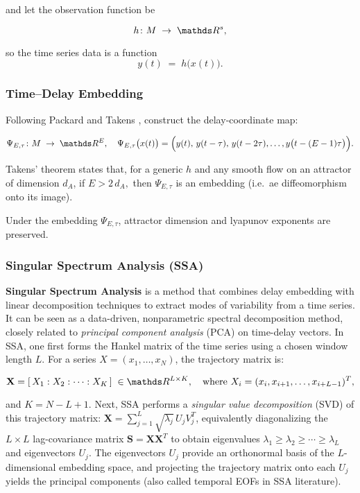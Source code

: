 \documentclass[14pt]{extarticle}
\begin{document}
	and let the observation function be
	
	$$
	h\colon M\;\to\;\dR^s, 
	$$
	
	so the time series data is a function $$ y(t)\;=\;h\bigl(x(t)\bigr). $$
	
	\subsubsection*{Time–Delay Embedding}
	
	Following Packard \citep{Packard1980} and Takens \citep{Takens1981}, construct the delay‐coordinate map:
	
	$$
	\Psi_{E,\tau}\colon M\;\to\;\dR^E,
	\quad
	\Psi_{E,\tau}\bigl(x(t)\bigr)
	=\Bigl(y(t),\,y(t-\tau),\,y(t-2\tau),\dots,y\bigl(t-(E-1)\tau\bigr)\Bigr).
	$$
	
	Takens’ theorem states that, for a generic $h$ and any smooth flow on an attractor of dimension $d_A$, if $E > 2\,d_A,$ then $\Psi_{E,\tau}$ is an embedding (i.e.\ ae diffeomorphism onto its image).
	
	Under the embedding $\Psi_{E,\tau}$, attractor dimension and lyapunov exponents are preserved.
	
	\subsubsection*{Singular Spectrum Analysis (SSA)}
	
	\textbf{Singular Spectrum Analysis} is a method that combines delay embedding with linear decomposition techniques to extract modes of variability from a time series. It can be seen as a data-driven, nonparametric spectral decomposition method, closely related to \textit{principal component analysis} (PCA) on time-delay vectors. In SSA, one first forms the Hankel matrix of the time series using a chosen window length $L$. For a series $X = (x_1, \dots, x_N)$, the trajectory matrix is: 
	
	$$ 
	\mathbf{X} = [\,X_1 : X_2 : \cdots : X_K\,] \;\in \dR^{L \times K}, \quad \text{where } X_i = (x_i, x_{i+1}, \dots, x_{i+L-1})^T, 
	$$ 
	
	and $K = N - L + 1$. 
	Next, SSA performs a \textit{singular value decomposition} (SVD) of this trajectory matrix: $\mathbf{X} = \sum_{j=1}^L \sqrt{\lambda_j}\,U_j V_j^T$, equivalently diagonalizing the $L\times L$ lag-covariance matrix $\mathbf{S} = \mathbf{X}\mathbf{X}^T$ to obtain eigenvalues $\lambda_1 \ge \lambda_2 \ge \cdots \ge \lambda_L$ and eigenvectors $U_j$. The eigenvectors $U_j$ provide an orthonormal basis of the $L$-dimensional embedding space, and projecting the trajectory matrix onto each $U_j$ yields the principal components (also called temporal EOFs in SSA literature). 
	
\end{document}
